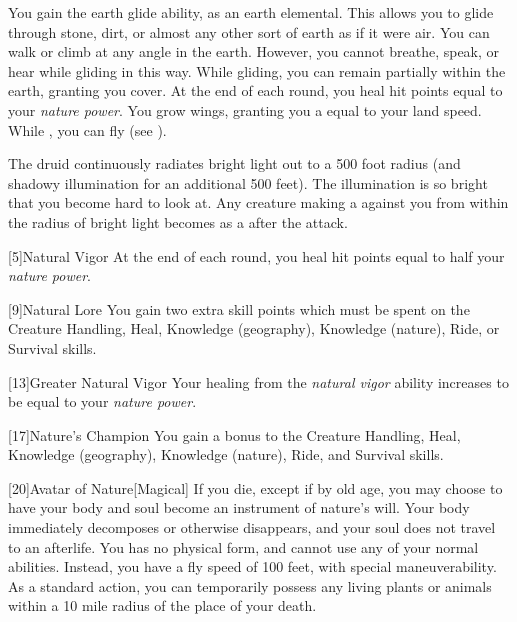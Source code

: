         You gain the earth glide ability, as an earth elemental.
        This allows you to glide through stone, dirt, or almost any other sort of earth as if it were air.
        You can walk or climb at any angle in the earth.
        However, you cannot breathe, speak, or hear while gliding in this way.
        While gliding, you can remain partially within the earth, granting you cover.
        At the end of each round, you heal hit points equal to your \textit{nature power}.
        You grow wings, granting you a  equal to your land speed.
        While , you can fly (see ).

        The druid continuously radiates bright light out to a 500 foot radius (and shadowy illumination for an additional 500 feet).
        The illumination is so bright that you become hard to look at.
        Any creature making a  against you from within the radius of bright light becomes \dazzled as a  after the attack.

        [5]{Natural Vigor}
        At the end of each round, you heal hit points equal to half your \textit{nature power}.

        [9]{Natural Lore}
        You gain two extra skill points which must be spent on the Creature Handling, Heal, Knowledge (geography), Knowledge (nature), Ride, or Survival skills.

        [13]{Greater Natural Vigor}
        Your healing from the \textit{natural vigor} ability increases to be equal to your \textit{nature power}.

        [17]{Nature's Champion}
        You gain a  bonus to the Creature Handling, Heal, Knowledge (geography), Knowledge (nature), Ride, and Survival skills.

        [20]{Avatar of Nature}[Magical]
        If you die, except if by old age, you may choose to have your body and soul become an instrument of nature's will.
        Your body immediately decomposes or otherwise disappears, and your soul does not travel to an afterlife.
        You has no physical form, and cannot use any of your normal abilities.
        Instead, you have a fly speed of 100 feet, with special maneuverability.
        As a standard action, you can temporarily possess any living plants or animals within a 10 mile radius of the place of your death.


